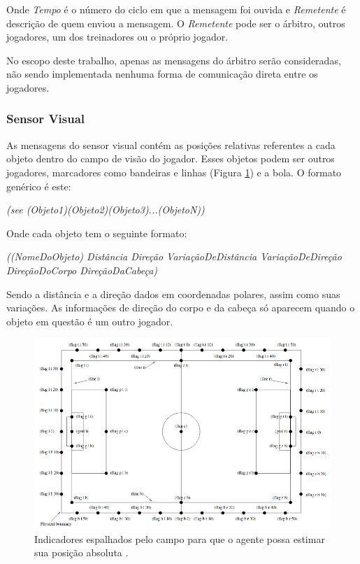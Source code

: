 Onde \textit{Tempo} é o número do ciclo em que a mensagem foi ouvida e \textit{Remetente} é descrição de quem enviou a mensagem. O \textit{Remetente} pode ser o árbitro, outros jogadores, um dos treinadores ou o próprio jogador.

No escopo deste trabalho, apenas as mensagens do árbitro serão consideradas, não sendo implementada nenhuma forma de comunicação direta entre os jogadores.

\subsubsection{Sensor Visual}

As mensagens do sensor visual contém as posições relativas referentes a cada objeto dentro do campo de visão do jogador. Esses objetos podem ser outros jogadores, marcadores como bandeiras e linhas (Figura \ref{fig:flags}) e a bola. O formato genérico é este:

\textit{(see (Objeto1)(Objeto2)(Objeto3)...(ObjetoN))}

Onde cada objeto tem o seguinte formato:

\textit{((NomeDoObjeto) Distância Direção VariaçãoDeDistância VariaçãoDeDireção DireçãoDoCorpo DireçãoDaCabeça)}

Sendo a distância e a direção dados em coordenadas polares, assim como suas variações. As informações de direção do corpo e da cabeça só aparecem quando o objeto em questão é um outro jogador.

\begin{figure}[H]
	\includegraphics[width=0.9\linewidth]{figs/flags.png}
	\centering
	\caption{Indicadores espalhados pelo campo para que o agente possa estimar sua posição absoluta \cite{rcssmanual2003}.}
	\label{fig:flags}
\end{figure}

